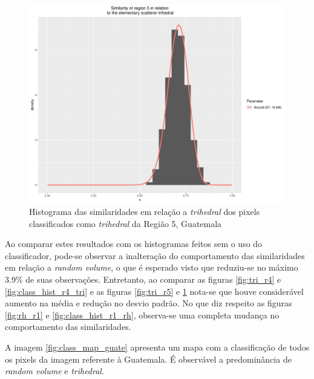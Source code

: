 \documentclass[12pt]{article}
\begin{document}
\begin{figure}[!h]
    \centering    
    \includegraphics[width = 0.8\linewidth]{../../Images/Report_18_12_20/Classifier_Geo_Dist/Histograms/Guate/region5_tri_sm_filter.pdf}
    \caption{Histograma das similaridades em relação a \textit{trihedral} dos pixels classificados como \textit{trihedral} da Região 5, Guatemala}
    \label{fig:class_hist_r5_tri}
\end{figure}

Ao comparar estes resultados com os histogramas feitos sem o uso do classificador, pode-se observar a inalteração do comportamento das similaridades em relação a \textit{random volume}, o que é esperado visto que reduziu-se no máximo 3.9\% de suas observações. Entretanto, ao comparar as figuras \ref{fig:tri_r4} e \ref{fig:class_hist_r4_tri} e as figuras \ref{fig:tri_r5} e \ref{fig:class_hist_r5_tri} nota-se que houve considerável aumento na média e redução no desvio padrão. No que diz respeito as figuras \ref{fig:rh_r1} e \ref{fig:class_hist_r1_rh}, observa-se uma completa mudança no comportamento das similaridades.

A imagem \ref{fig:class_map_guate} apresenta um mapa com a classificação de todos os pixels da imagem referente à Guatemala. É observável a predominância de \textit{random volume} e \textit{trihedral}.
\end{document}
